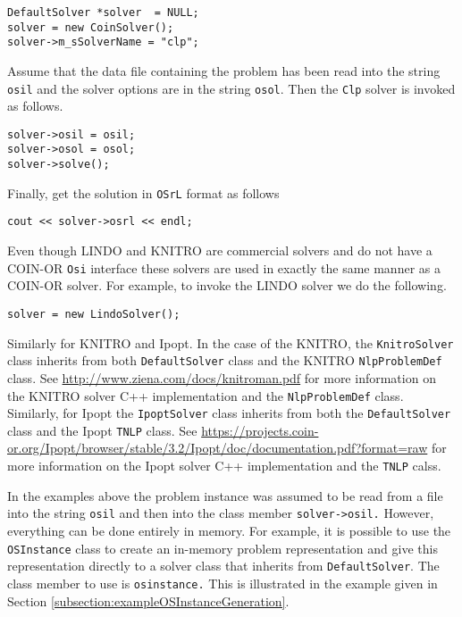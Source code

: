 \documentclass[11pt]{article}
\renewcommand{\_}{{\char"5F}}
\renewcommand{\{}{{\char"7B}}
\renewcommand{\}}{{\char"7D}}
\renewcommand{\^}{{\char"0D}}
\renewcommand{\'}{{\char"0D}}
\begin{document}
\begin{verbatim}
DefaultSolver *solver  = NULL;
solver = new CoinSolver();
solver->m_sSolverName = "clp";
\end{verbatim}

Assume that the data file containing the problem has been read into the string {\tt osil} and the solver options are in the string {\tt osol}. Then the {\tt Clp} solver is invoked as follows.

\begin{verbatim}
solver->osil = osil;
solver->osol = osol;
solver->solve();
\end{verbatim}

Finally, get the solution in {\tt OSrL} format as follows

\begin{verbatim}
cout << solver->osrl << endl;
\end{verbatim}

Even though LINDO and KNITRO are commercial solvers and do not have a COIN-OR {\tt Osi} interface these solvers are used in exactly the same manner as a COIN-OR solver. For example, to invoke the LINDO solver we do the following.

\begin{verbatim}
solver = new LindoSolver();	
\end{verbatim}

Similarly for KNITRO and Ipopt. In the case of the KNITRO, the {\tt KnitroSolver} class inherits from both {\tt DefaultSolver} class and the KNITRO {\tt NlpProblemDef} class. See \url{http://www.ziena.com/docs/knitroman.pdf} for more information on the KNITRO solver C++ implementation and the {\tt NlpProblemDef} class. Similarly, for Ipopt the {\tt IpoptSolver} class inherits from both the  {\tt DefaultSolver} class and the Ipopt {\tt TNLP} class.  See \url{https://projects.coin-or.org/Ipopt/browser/stable/3.2/Ipopt/doc/documentation.pdf?format=raw} for more information on the Ipopt solver C++ implementation and the {\tt TNLP} calss.

In the examples above the problem instance was assumed to be read from a file into the string {\tt osil} and then into the class member {\tt solver->osil.} However, everything can be done entirely in memory. For example, it is possible to use the {\tt OSInstance} class to create an in-memory problem representation and give this representation directly to a solver class that inherits from {\tt DefaultSolver}. The class member to use is {\tt osinstance.} This is illustrated in the example given in Section \ref{subsection:exampleOSInstanceGeneration}.
\end{document}
